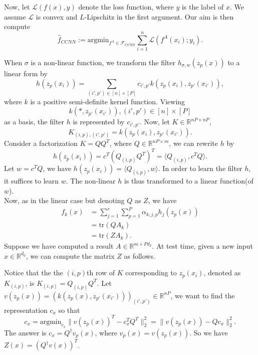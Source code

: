 \documentclass{article}
\begin{document}
Now, let $\mathcal{L}(f(x),y)$ denote the loss function, where $y$ is the label of $x$. We assume $\mathcal{L}$ is convex and $L$-Lipschitz in the first argument. Our aim is then compute
\[\widehat{f}_{CCNN}:=\text{argmin}_{f^A\in\mathcal{F}_{\text{CCNN}}}\sum_{i=1}^n\mathcal{L}(f^A(x_i);y_i).\]

When $\sigma$ is a non-linear function, we transform the filter $h_{\sigma,w}(z_p(x))$ to a linear form by
\[h(z_p(x_i))=\sum_{(i',p')\in[n]\times[P]}c_{i',p'}k(z_p(x_i),z_{p'}(x_{i'})),\]
where $k$ is a positive semi-definite kernel function. Viewing \[k(*,z_{p'}(x_{i'})),(i',p')\in[n]\times[P]\] as a basis, the filter $h$ is represented by $c_{i',p'}$. Now, let $K\in\mathbb{R}^{nP\times nP}$,
\[K_{(i,p),(i',p')}=k(z_p(x_i),z_{p'}(x_{i'})).\]
Consider a factorization $K=QQ^T$, where $Q\in\mathbb{R}^{nP\times m}$, we can rewrite $h$ by 
\[h(z_p(x_i))=c^T(Q_{(i,p)}Q^T)^T=\langle Q_{(i,p)},c^TQ\rangle.\]
Let $w=c^TQ$, we have $h(z_p(x_i))=\langle Q_{(i,p)},w\rangle$. In order to learn the filter $h$, it suffices to learn $w$. The non-linear $h$ is thus transformed to a linear function(of $w$).\\
Now, as in the linear case but denoting $Q$ as $Z$, we have
\begin{align*}
f_k(x)&=\sum_{j=1}^{r}\sum_{p=1}^{P}\alpha_{k,j,p}h_j(z_p(x))\\
&=\text{tr}(QA_k)\\
&=\text{tr}(ZA_k).
\end{align*}
Suppose we have computed a result $A\in\mathbb{R}^{m\times Pd_2}$. At test time, given a new input $x\in\mathbb{R}^{d_0}$, we can compute the matrix $Z$ as follows.

Notice that the the $(i,p)$th row of $K$ corresponding to $z_p(x_i)$, denoted as $K_{(i,p)}$, is $K_{(i,p)}=Q_{(i,p)}Q^T$. Let $v(z_p(x))=(k(z_p(x),z_{p'}(x_{i'})))_{(i',p')}\in\mathbb{R}^{nP}$, we want to find the representation $c_x$ so that
\[c_x=\text{argmin}_{c_x}\|v(z_p(x))^T-c_x^TQ^T\|_2^2=\|v(z_p(x))-Qc_x\|_2^2.\]
The answer is $c_x=Q^\dagger v_p(x)$, where $v_p(x)=v(z_p(x))$. So we have $Z(x)=(Q^\dagger v(x))^T$.
\end{document}
